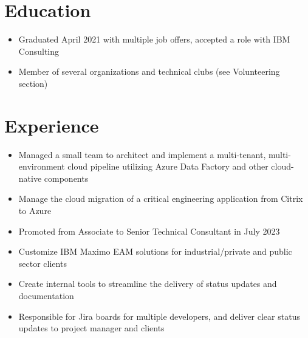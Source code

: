 \documentclass[]{rcf_cv}
\begin{document}
	
	

	\section{Education}
	
		\begin{itemize}
			\setlength\itemsep{-0.4em}
			\renewcommand\labelitemi{--}
			
			\item Graduated April 2021 with multiple job offers, accepted a role with IBM Consulting
			\item Member of several organizations and technical clubs (see Volunteering section)
					
			
			
		\end{itemize}
	
	\section{Experience}
	
	\begin{itemize}
		\setlength\itemsep{-0.4em}
		\renewcommand\labelitemi{--}
		
		\item Managed a small team to architect and implement a multi-tenant, multi-environment cloud pipeline utilizing Azure Data Factory and other cloud-native components
		\item Manage the cloud migration of a critical engineering application from Citrix to Azure
		\item Promoted from Associate to Senior Technical Consultant in July 2023
		\item Customize IBM Maximo EAM solutions for industrial/private and public sector clients
		\item Create internal tools to streamline the delivery of status updates and documentation
		\item Responsible for Jira boards for multiple developers, and deliver clear status updates to project manager and clients
		
	\end{itemize}
	
\end{document}
